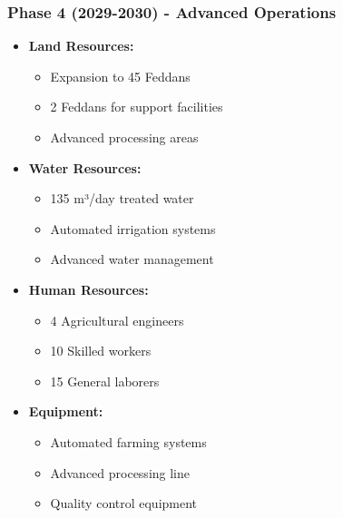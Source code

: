 \subsubsection{Phase 4 (2029-2030) - Advanced Operations}
\begin{itemize}
    \item \textbf{Land Resources:}
    \begin{itemize}
        \item Expansion to 45 Feddans
        \item 2 Feddans for support facilities
        \item Advanced processing areas
    \end{itemize}
    \item \textbf{Water Resources:}
    \begin{itemize}
        \item 135 m³/day treated water
        \item Automated irrigation systems
        \item Advanced water management
    \end{itemize}
    \item \textbf{Human Resources:}
    \begin{itemize}
        \item 4 Agricultural engineers
        \item 10 Skilled workers
        \item 15 General laborers
    \end{itemize}
    \item \textbf{Equipment:}
    \begin{itemize}
        \item Automated farming systems
        \item Advanced processing line
        \item Quality control equipment
    \end{itemize}
\end{itemize}

